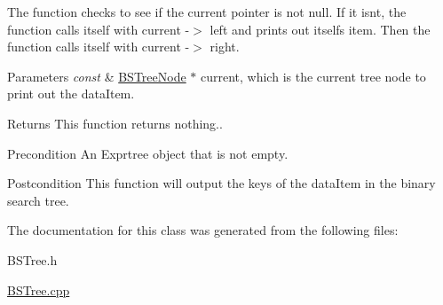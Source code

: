 The function checks to see if the current pointer is not null. If it isnt, the function calls itself with current -\/$>$ left and prints out itself\textquotesingle{}s item. Then the function calls itself with current -\/$>$ right.


\begin{DoxyParams}{Parameters}
{\em const} & \hyperlink{class_b_s_tree_1_1_b_s_tree_node}{B\+S\+Tree\+Node} $\ast$ current, which is the current tree node to print out the data\+Item. \\
\hline
\end{DoxyParams}
\begin{DoxyReturn}{Returns}
This function returns nothing..
\end{DoxyReturn}
\begin{DoxyPrecond}{Precondition}
An Exprtree object that is not empty. 
\end{DoxyPrecond}
\begin{DoxyPostcond}{Postcondition}
This function will output the keys of the data\+Item in the binary search tree. 
\end{DoxyPostcond}


The documentation for this class was generated from the following files\+:\begin{DoxyCompactItemize}
\item 
B\+S\+Tree.\+h\item 
\hyperlink{_b_s_tree_8cpp}{B\+S\+Tree.\+cpp}\end{DoxyCompactItemize}
